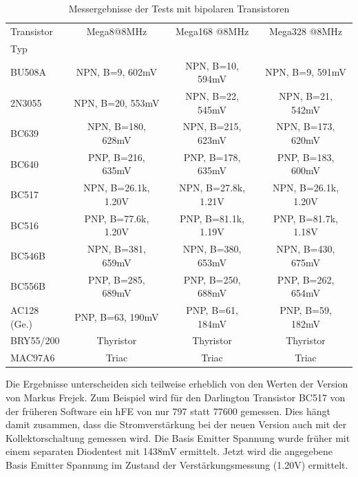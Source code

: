 \begin{table}[H]
  \begin{center}
    \begin{tabular}{| l | c | c | c |}
    \hline
 Transistor & Mega8@8MHz          & Mega168 @8MHz       & Mega328 @8MHz    \\
    Typ     &                     &                     &                  \\
    \hline
    \hline
BU508A      & NPN, B=9, 602mV     & NPN, B=10, 594mV    & NPN, B=9, 591mV   \\
    \hline
2N3055      & NPN, B=20, 553mV    & NPN, B=22, 545mV    & NPN, B=21, 542mV  \\
    \hline
BC639       & NPN, B=180, 628mV   & NPN, B=215, 623mV   & NPN, B=173, 620mV \\
    \hline
BC640       & PNP, B=216, 635mV   & PNP, B=178, 635mV   & PNP, B=183, 600mV \\
    \hline
BC517       & NPN, B=26.1k, 1.20V & NPN, B=27.8k, 1.21V & NPN, B=26.1k, 1.20V\\
    \hline
BC516       & PNP, B=77.6k, 1.20V & PNP, B=81.1k, 1.19V & PNP, B=81.7k, 1.18V\\
    \hline
BC546B      & NPN, B=381, 659mV   & NPN, B=380, 653mV   & NPN, B=430, 675mV \\
    \hline
BC556B      & PNP, B=285, 689mV   & PNP, B=250, 688mV   & PNP, B=262, 654mV \\
    \hline
AC128 (Ge.) & PNP, B=63, 190mV    & PNP, B=61, 184mV    & PNP, B=59, 182mV  \\
    \hline
BRY55/200   & Thyristor           & Thyristor           & Thyristor        \\
    \hline
MAC97A6     & Triac               & Triac               & Triac        \\
    \hline
    \end{tabular}
  \end{center}
  \caption{Messergebnisse der Tests mit bipolaren Transistoren}
  \label{tab:bipolar} 
\end{table}

Die Ergebnisse unterscheiden sich teilweise erheblich von den Werten der Version 
von Markus Frejek. Zum Beispiel wird für den Darlington Transistor BC517 von
der früheren Software ein hFE von nur 797 statt 77600 gemessen. 
Dies hängt damit zusammen, dass die Stromverstärkung bei der neuen Version auch mit der
Kollektorschaltung gemessen wird.
Die Basis Emitter Spannung wurde früher mit einem separaten Diodentest mit 1438mV ermittelt.
Jetzt wird die angegebene Basis Emitter Spannung im Zustand der Verstärkungsmessung (1.20V) ermittelt.

